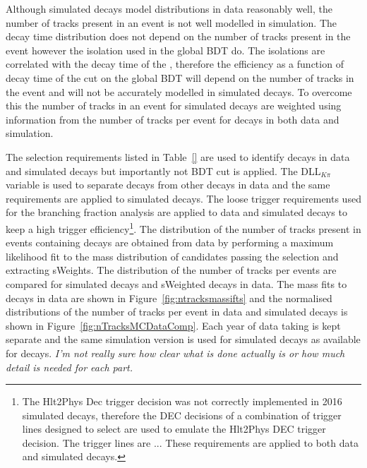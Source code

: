 Although simulated decays model distributions in data reasonably well, the number of tracks present in an event is not well modelled in simulation. %
The \bs decay time distribution does not depend on the number of tracks present in the event however the isolation used in the global BDT do. The isolations are correlated with the decay time of the \bs, therefore the efficiency as a function of decay time of the cut on the global BDT will depend on the number of tracks in the event and will not be accurately modelled in simulated decays.  
To overcome this the number of tracks in an event for simulated \bsmumu decays are weighted using information from the number of tracks per event for \bdkpi decays in both data and simulation. 

The selection requirements listed in Table~\ref{} are used to identify \bdkpi decays in data and simulated decays but importantly not BDT cut is applied. The DLL$_{K\pi}$ variable is used to separate \bdkpi decays from other \bhh decays in data and the same requirements are applied to simulated decays. The loose trigger requirements used for the branching fraction analysis are applied to data and simulated decays to keep a high trigger efficiency\footnote{The Hlt2Phys Dec trigger decision was not correctly implemented in 2016 simulated decays, therefore the DEC decisions of a combination of trigger lines designed to select \bhh are used to emulate the Hlt2Phys DEC trigger decision. The trigger lines are ... These requirements are applied to both data and simulated decays.}. The distribution of the number of tracks present in events containing \bdkpi decays are obtained from data by performing a maximum likelihood fit to the \bd mass distribution of candidates passing the selection and extracting sWeights. The distribution of the number of tracks per events are compared for simulated \bdkpi decays and sWeighted \bdkpi decays in data. The mass fits to \bdkpi decays in data are shown in Figure~\ref{fig:ntracksmassifts} and the normalised distributions of the number of tracks per event in data and simulated decays is shown in Figure~\ref{fig:nTracksMCDataComp}. Each year of data taking is kept separate and the same simulation version is used for \bdkpi simulated decays as available for \bsmumu decays.
{\it I'm not really sure how clear what is done actually is or how much detail is needed for each part.} 



